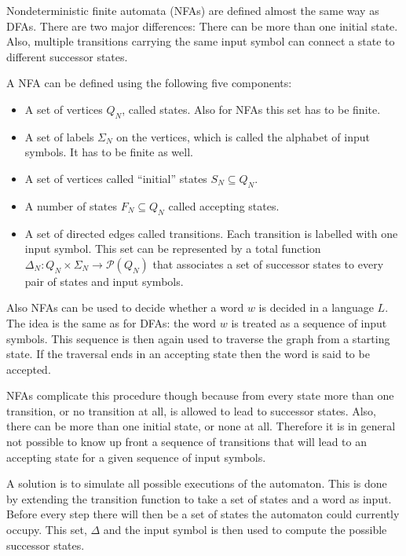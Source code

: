 Nondeterministic finite automata (NFAs) are defined almost the same way as DFAs.
There are two major differences: There can be more than one initial state.
Also, multiple transitions carrying the same input symbol can connect a state to different
successor states.

\begin{definition}
    A NFA can be defined using the following five components:

    \begin{itemize}
        \item A set of vertices $Q_N$, called states.
        Also for NFAs this set has to be finite.
        \item A set of labels $\Sigma_N$ on the vertices,
        which is called the alphabet of input symbols.
        It has to be finite as well.
        \item A set of vertices called ``initial'' states $S_N \subseteq Q_N$.
        \item A number of states $F_N \subseteq Q_N$ called accepting states.
        \item A set of directed edges called transitions.
        Each transition is labelled with one input symbol.
        This set can be represented by a total function
        $\Delta_N : Q_N \times \Sigma_N \rightarrow \mathcal{P}(Q_N)$
        that associates a set of successor states to every pair of states and input symbols.
    \end{itemize}
\end{definition}

Also NFAs can be used to decide whether a word $w$ is decided in a language $L$.
The idea is the same as for DFAs: the word $w$ is treated as a sequence of input symbols.
This sequence is then again used to traverse the graph from a starting state.
If the traversal ends in an accepting state then the word is said to be accepted.

NFAs complicate this procedure though because from every state more than one
transition, or no transition at all, is allowed to lead to successor states.
Also, there can be more than one initial state, or none at all.
Therefore it is in general not possible to know up front
a sequence of transitions that will lead to an accepting state
for a given sequence of input symbols.

A solution is to simulate all possible executions of the automaton.
This is done by extending the transition function to take
a set of states and a word as input.
Before every step there will then be a set of states the automaton
could currently occupy.
This set, $\Delta$ and the input symbol is then used to compute the possible successor states.

